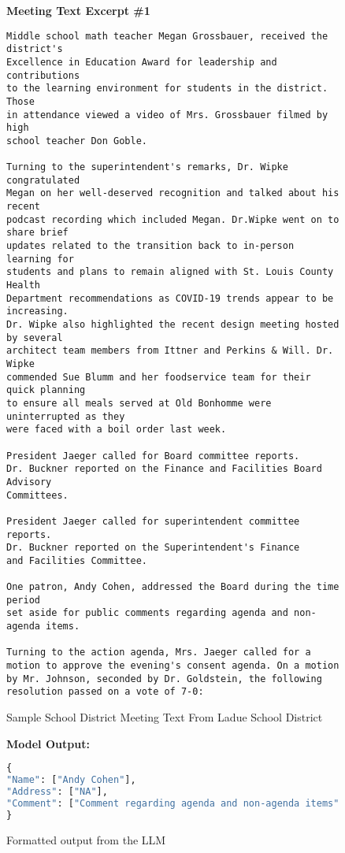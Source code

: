 \begin{figure}[H]
\centering
\textbf{Meeting Text Excerpt \#1}\par\medskip
\begin{lstlisting}[label={lst:brief-text}]
Middle school math teacher Megan Grossbauer, received the district's 
Excellence in Education Award for leadership and contributions 
to the learning environment for students in the district. Those 
in attendance viewed a video of Mrs. Grossbauer filmed by high 
school teacher Don Goble.

Turning to the superintendent's remarks, Dr. Wipke congratulated 
Megan on her well-deserved recognition and talked about his recent 
podcast recording which included Megan. Dr.Wipke went on to share brief 
updates related to the transition back to in-person learning for
students and plans to remain aligned with St. Louis County Health 
Department recommendations as COVID-19 trends appear to be increasing. 
Dr. Wipke also highlighted the recent design meeting hosted by several 
architect team members from Ittner and Perkins & Will. Dr. Wipke 
commended Sue Blumm and her foodservice team for their quick planning 
to ensure all meals served at Old Bonhomme were uninterrupted as they 
were faced with a boil order last week.

President Jaeger called for Board committee reports. 
Dr. Buckner reported on the Finance and Facilities Board Advisory 
Committees.

President Jaeger called for superintendent committee reports. 
Dr. Buckner reported on the Superintendent's Finance 
and Facilities Committee.

One patron, Andy Cohen, addressed the Board during the time period 
set aside for public comments regarding agenda and non-agenda items.

Turning to the action agenda, Mrs. Jaeger called for a 
motion to approve the evening's consent agenda. On a motion 
by Mr. Johnson, seconded by Dr. Goldstein, the following
resolution passed on a vote of 7-0:
\end{lstlisting}
\caption[Meeting Text Example \#1]{Sample School District Meeting Text From Ladue School District}
\end{figure}


\begin{figure}[H]
\centering
\textbf{Model Output:}\par\medskip
\begin{lstlisting}[language=python]
{
"Name": ["Andy Cohen"],
"Address": ["NA"],
"Comment": ["Comment regarding agenda and non-agenda items"]
}
\end{lstlisting}
\caption[Meeting Text Example Output \#1]{Formatted output from the LLM}
\end{figure}

